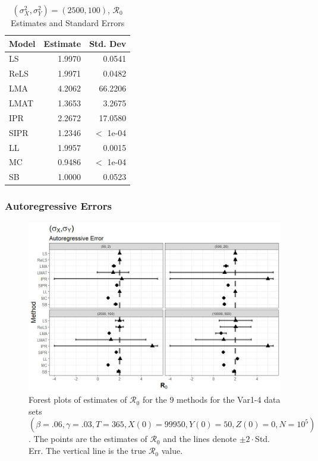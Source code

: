 \documentclass[12pt]{article}
\newcommand{\xxsir}{\ensuremath{9} } %
\newcommand{\rr}{\ensuremath{\mathcal{R}_0}}
\begin{document}
\begin{table}[H]
	
	
	\centering
	\begin{tabular}[t]{l|r|r}
		\hline
		Model & Estimate & Std. Dev\\
		\hline
		LS & 1.9970 & 0.0541\\
		\hline
		ReLS & 1.9971 & 0.0482\\
		\hline
		LMA & 4.2062 & 66.2206\\
		\hline
		LMAT & 1.3653 & 3.2675\\
		\hline
		IPR & 2.2672 & 17.0580\\
		\hline
		SIPR & 1.2346 & $<$ 1e-04\\
		\hline
		LL & 1.9957 & 0.0015\\
		\hline
		MC & 0.9486 & $<$ 1e-04\\
		\hline
		SB & 1.0000 & 0.0523\\
		\hline
	\end{tabular}
	\caption{$(\sigma^2_X, \sigma^2_Y) = (2500, 100)$, $\rr$ Estimates and Standard Errors}
\end{table}

\subsubsection{Autoregressive Errors}

\begin{figure}[H]
	\begin{center}
		\includegraphics[scale=0.5]{images/var_ar.jpeg}
		\caption{Forest plots of estimates of $\rr$ for the \xxsir methods for the Var1-4 data sets $(\beta=.06, \gamma=.03, T=365, X(0)=99950, Y(0)=50, Z(0)=0, N=10^5)$.  The points are the estimates of $\rr$ and the lines denote $\pm 2\cdot $Std. Err.  The vertical line is the true $\rr$ value.}
	\end{center}
\end{figure}
\end{document}

